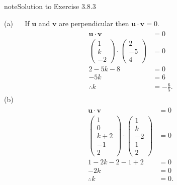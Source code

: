 \documentclass[letterpaper,10pt,english]{jupyterBook}
\begin{document}
\begin{sphinxadmonition}{note}{Solution to Exercise 3.8.3}



\sphinxAtStartPar
(a)   If \(\mathbf{u}\) and \(\mathbf{v}\) are perpendicular then \(\mathbf{u} \cdot \mathbf{v} = 0\).
\begin{equation*}
\begin{split} \begin{align*}
    \mathbf{u} \cdot \mathbf{v} &= 0 \\
    \begin{pmatrix} 1 \\ k \\ -2 \end{pmatrix} \cdot
    \begin{pmatrix} 2 \\ -5 \\ 4 \end{pmatrix} &= 0 \\
    2 - 5 k - 8 &= 0 \\
    -5k &= 6 \\
    \therefore k &= -\frac{6}{5}.
\end{align*} \end{split}
\end{equation*}
\sphinxAtStartPar
(b)  
\begin{equation*}
\begin{split} \begin{align*}
    \mathbf{u} \cdot \mathbf{v} &= 0 \\
    \begin{pmatrix} 1 \\ 0 \\ k + 2 \\ -1 \\ 2 \end{pmatrix} \cdot 
    \begin{pmatrix} 1 \\ k \\ -2 \\ 1 \\ 2 \end{pmatrix} &= 0 \\
    1 - 2k - 2 - 1 + 2 &= 0 \\
    -2k &= 0 \\
    \therefore k &= 0.
\end{align*} \end{split}
\end{equation*}\end{sphinxadmonition}
 \label{_pages/A3_Vectors_exercises_solutions:_pages/A3_Vectors_exercises_solutions-solution-3}
\end{document}
